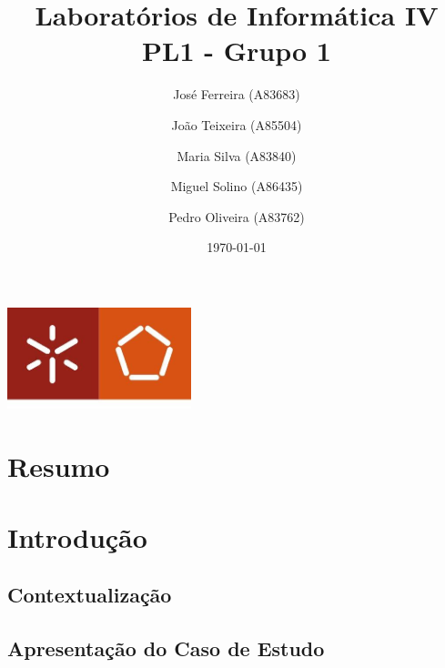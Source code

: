 \documentclass[a4paper]{report}
\begin{document}
\title{Laboratórios de Informática IV\\
\large PL1 - Grupo 1}
\author{José Ferreira (A83683) \and João Teixeira (A85504) \and Maria Silva (A83840) \and Miguel Solino (A86435) \and Pedro Oliveira (A83762)}
\date{\today}

\begin{center}
    \begin{minipage}{0.75\linewidth}
        \centering
        \includegraphics[width=0.4\textwidth]{images/eng.jpeg}\par\vspace{1cm}
        \vspace{1.5cm}
        \href{https://www.uminho.pt/PT}
        {\color{black}{\scshape\LARGE Universidade do Minho}} \par
        \vspace{1cm}
        \href{https://www.di.uminho.pt/}
        {\color{black}{\scshape\Large Departamento de Informática}} \par
        \vspace{1.5cm}
        \maketitle
    \end{minipage}
\end{center}


\chapter{Resumo}

\tableofcontents

\chapter{Introdução}
    \section{Contextualização}
    \section{Apresentação do Caso de Estudo}
\end{document}
